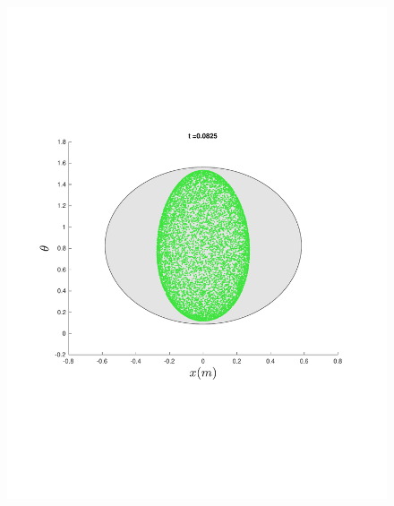 \begin{figure}
{\begin{minipage}{0.5\textwidth}
\begin{minipage}[b]{0.5\textwidth}
        \includegraphics[width=\textwidth]{figures/method/FunnelSimOverlaid12funnel-1y-theta}
      \end{minipage}%
      \begin{minipage}[b]{0.5\textwidth}

\end{minipage}
\end{minipage}}
\end{figure}
